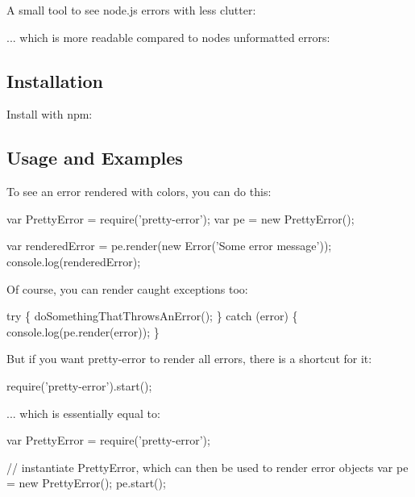 \href{https://david-dm.org/AriaMinaei/pretty-error}{\tt } \href{https://travis-ci.org/AriaMinaei/pretty-error}{\tt } \href{https://npmjs.org/package/pretty-error}{\tt }

A small tool to see node.\+js errors with less clutter\+:



... which is more readable compared to node\textquotesingle{}s unformatted errors\+:



\subsection*{Installation}

Install with npm\+: 


\subsection*{Usage and Examples}

To see an error rendered with colors, you can do this\+:


\begin{DoxyCode}
var PrettyError = require('pretty-error');
var pe = new PrettyError();

var renderedError = pe.render(new Error('Some error message'));
console.log(renderedError);
\end{DoxyCode}


Of course, you can render caught exceptions too\+:


\begin{DoxyCode}
try \{
   doSomethingThatThrowsAnError();
\} catch (error) \{
   console.log(pe.render(error));
\}
\end{DoxyCode}


But if you want pretty-\/error to render all errors, there is a shortcut for it\+:


\begin{DoxyCode}
require('pretty-error').start();
\end{DoxyCode}


... which is essentially equal to\+:


\begin{DoxyCode}
var PrettyError = require('pretty-error');

// instantiate PrettyError, which can then be used to render error objects
var pe = new PrettyError();
pe.start();
\end{DoxyCode}


